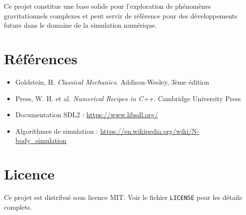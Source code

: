 \documentclass[12pt,a4paper]{article}
\begin{document}
Ce projet constitue une base solide pour l'exploration de phénomènes gravitationnels complexes et peut servir de référence pour des développements futurs dans le domaine de la simulation numérique.

\appendix

\section{Références}

\begin{itemize}
    \item Goldstein, H. \textit{Classical Mechanics}. Addison-Wesley, 3ème édition
    \item Press, W. H. et al. \textit{Numerical Recipes in C++}. Cambridge University Press
    \item Documentation SDL2 : \url{https://www.libsdl.org/}
    \item Algorithmes de simulation : \url{https://en.wikipedia.org/wiki/N-body_simulation}
\end{itemize}

\section{Licence}

Ce projet est distribué sous licence MIT. Voir le fichier \texttt{LICENSE} pour les détails complets.
\end{document}
